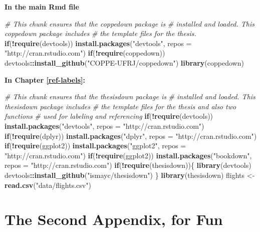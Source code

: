 \documentclass[msc,numbers]{coppe}
\newenvironment{Shaded}{\begin{snugshade}}{\end{snugshade}}
\newcommand{\CommentTok}[1]{\textcolor[rgb]{0.56,0.35,0.01}{\textit{#1}}}
\newcommand{\ControlFlowTok}[1]{\textcolor[rgb]{0.13,0.29,0.53}{\textbf{#1}}}
\newcommand{\DataTypeTok}[1]{\textcolor[rgb]{0.13,0.29,0.53}{#1}}
\newcommand{\KeywordTok}[1]{\textcolor[rgb]{0.13,0.29,0.53}{\textbf{#1}}}
\newcommand{\NormalTok}[1]{#1}
\newcommand{\OperatorTok}[1]{\textcolor[rgb]{0.81,0.36,0.00}{\textbf{#1}}}
\newcommand{\StringTok}[1]{\textcolor[rgb]{0.31,0.60,0.02}{#1}}
\begin{document}
  \textbf{In the main Rmd file}
  \begin{Shaded}
  \begin{Highlighting}[]
  \CommentTok{# This chunk ensures that the coppedown package is}
  \CommentTok{# installed and loaded. This coppedown package includes}
  \CommentTok{# the template files for the thesis.}
  \ControlFlowTok{if}\NormalTok{(}\OperatorTok{!}\KeywordTok{require}\NormalTok{(devtools))}
    \KeywordTok{install.packages}\NormalTok{(}\StringTok{"devtools"}\NormalTok{, }\DataTypeTok{repos =} \StringTok{"http://cran.rstudio.com"}\NormalTok{)}
  \ControlFlowTok{if}\NormalTok{(}\OperatorTok{!}\KeywordTok{require}\NormalTok{(coppedown))}
  \NormalTok{  devtools}\OperatorTok{::}\KeywordTok{install_github}\NormalTok{(}\StringTok{"COPPE-UFRJ/coppedown"}\NormalTok{)}
  \KeywordTok{library}\NormalTok{(coppedown)}
  \end{Highlighting}
  \end{Shaded}
  \textbf{In Chapter \ref{ref-labels}:}
  \begin{Shaded}
  \begin{Highlighting}[]
  \CommentTok{# This chunk ensures that the thesisdown package is}
  \CommentTok{# installed and loaded. This thesisdown package includes}
  \CommentTok{# the template files for the thesis and also two functions}
  \CommentTok{# used for labeling and referencing}
  \ControlFlowTok{if}\NormalTok{(}\OperatorTok{!}\KeywordTok{require}\NormalTok{(devtools))}
    \KeywordTok{install.packages}\NormalTok{(}\StringTok{"devtools"}\NormalTok{, }\DataTypeTok{repos =} \StringTok{"http://cran.rstudio.com"}\NormalTok{)}
  \ControlFlowTok{if}\NormalTok{(}\OperatorTok{!}\KeywordTok{require}\NormalTok{(dplyr))}
      \KeywordTok{install.packages}\NormalTok{(}\StringTok{"dplyr"}\NormalTok{, }\DataTypeTok{repos =} \StringTok{"http://cran.rstudio.com"}\NormalTok{)}
  \ControlFlowTok{if}\NormalTok{(}\OperatorTok{!}\KeywordTok{require}\NormalTok{(ggplot2))}
      \KeywordTok{install.packages}\NormalTok{(}\StringTok{"ggplot2"}\NormalTok{, }\DataTypeTok{repos =} \StringTok{"http://cran.rstudio.com"}\NormalTok{)}
  \ControlFlowTok{if}\NormalTok{(}\OperatorTok{!}\KeywordTok{require}\NormalTok{(ggplot2))}
      \KeywordTok{install.packages}\NormalTok{(}\StringTok{"bookdown"}\NormalTok{, }\DataTypeTok{repos =} \StringTok{"http://cran.rstudio.com"}\NormalTok{)}
  \ControlFlowTok{if}\NormalTok{(}\OperatorTok{!}\KeywordTok{require}\NormalTok{(thesisdown))\{}
    \KeywordTok{library}\NormalTok{(devtools)}
  \NormalTok{  devtools}\OperatorTok{::}\KeywordTok{install_github}\NormalTok{(}\StringTok{"ismayc/thesisdown"}\NormalTok{)}
  \NormalTok{  \}}
  \KeywordTok{library}\NormalTok{(thesisdown)}
  \NormalTok{flights <-}\StringTok{ }\KeywordTok{read.csv}\NormalTok{(}\StringTok{"data/flights.csv"}\NormalTok{)}
  \end{Highlighting}
  \end{Shaded}
  \hypertarget{the-second-appendix-for-fun}{%
  \chapter{The Second Appendix, for Fun}\label{the-second-appendix-for-fun}}
  
\end{document}
